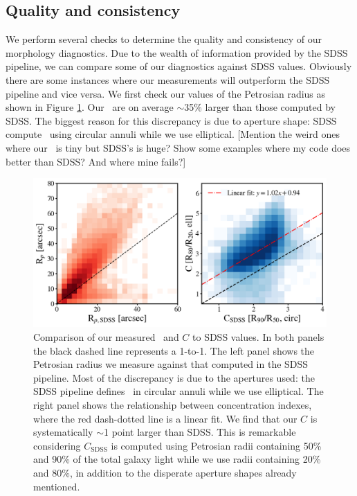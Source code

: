 \subsection{Quality and consistency}
We perform several checks to determine the quality and consistency of our morphology diagnostics. Due to the wealth of information provided by the SDSS pipeline, we can compare some of our diagnostics against SDSS values. Obviously there are some instances where our measurements will outperform the SDSS pipeline and vice versa. We first check our values of the Petrosian radius as shown in Figure \ref{fig: Rp and C comparison}. Our \rp~are on average $\sim$35\% larger than those computed by SDSS. The biggest reason for this discrepancy is due to aperture shape: SDSS compute \rp~using circular annuli while we use elliptical. [Mention the weird ones where our \rp~is tiny but SDSS's is huge? Show some examples where my code does better than SDSS? And where mine fails?]

\begin{figure}
\includegraphics[width=\textwidth]{Figures/compare_Rp_concentrations.png}
\caption[Comparison of Petrosian radius and concentration index from this work to SDSS values]{Comparison of our measured \rp~and $C$ to SDSS values. In both panels the black dashed line represents a 1-to-1. The left panel shows the Petrosian radius we measure against that computed in the SDSS pipeline. Most of the discrepancy is due to the apertures used: the SDSS pipeline defines \rp~in circular annuli while we use elliptical. 
The right panel shows the relationship between concentration indexes, where the red dash-dotted line is a linear fit. We find that our $C$ is systematically $\sim$1 point larger than SDSS. This is remarkable considering $C_{\mathrm{SDSS}}$ is computed using Petrosian radii containing 50\% and 90\% of the total galaxy light while we use radii containing 20\% and 80\%, in addition to the disperate aperture shapes already mentioned.}
\label{fig: Rp and C comparison}
\end{figure}

